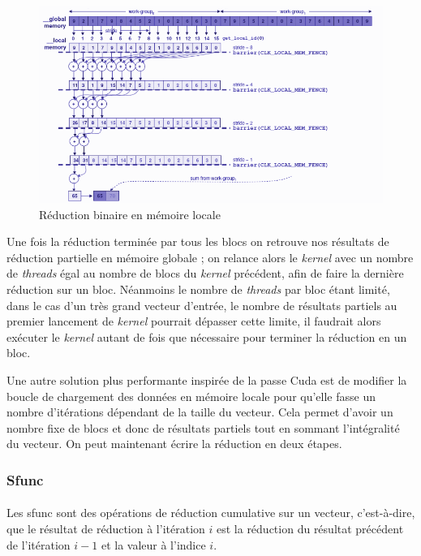 \begin{figure}[h]
   \begin{center}
      \includegraphics[scale=0.75]{./images/binary_reduce.png}
   \end{center}
   \caption{Réduction binaire en mémoire locale~\cite{binary_sum}}
   \label{binary_sum}
\end{figure}

Une fois la réduction terminée par tous les blocs on retrouve nos résultats de
réduction partielle en mémoire globale ; on relance alors le \emph{kernel} avec
un nombre de \emph{threads} égal au nombre de blocs du \emph{kernel} précédent,
afin de faire la dernière réduction sur un bloc. Néanmoins le nombre de
\emph{threads} par bloc étant limité, dans le cas d'un très grand vecteur
d'entrée, le nombre de résultats partiels au premier lancement de \emph{kernel}
pourrait dépasser cette limite, il faudrait alors exécuter le \emph{kernel}
autant de fois que nécessaire pour terminer la réduction en un bloc.

Une autre solution plus performante inspirée de la passe Cuda est de modifier la
boucle de chargement des données en mémoire locale pour qu'elle fasse un nombre
d'itérations dépendant de la taille du vecteur. Cela permet d'avoir un nombre
fixe de blocs et donc de résultats partiels tout en sommant l'intégralité du
vecteur. On peut maintenant écrire la réduction en deux étapes.

\subsubsection{Sfunc}
\paragraph{}
Les sfunc sont des opérations de réduction cumulative sur un vecteur,
c'est-à-dire, que le résultat de réduction à l'itération $i$ est la réduction du
résultat précédent de l'itération $i-1$ et la valeur à l'indice $i$.

